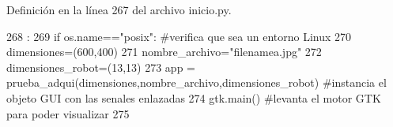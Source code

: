Definición en la línea 267 del archivo inicio.py.


\begin{DoxyCode}
268           :
269         if os.name=="posix": #verifica que sea un entorno Linux
270                 dimensiones=(600,400)
271                 nombre_archivo="filenamea.jpg"
272                 dimensiones_robot=(13,13)
273                 app = prueba_adqui(dimensiones,nombre_archivo,dimensiones_robot) 
      #instancia el objeto GUI con las senales enlazadas
274                 gtk.main() #levanta el motor GTK para poder visualizar
275   

\end{DoxyCode}
